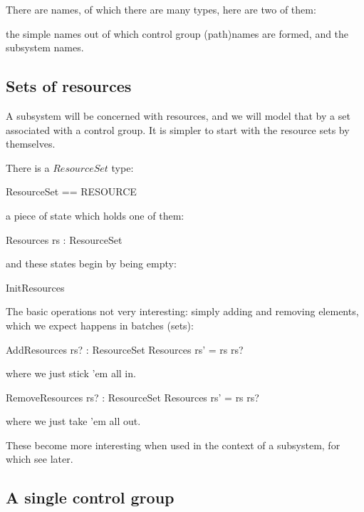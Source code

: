 \documentclass[a4paper,twoside,12pt]{article}
\begin{document}
There are names, of which there are many types, here are two of them:
\begin{zed}
\end{zed}
the simple names out of which control group (path)names are formed, and the subsystem names.

\subsection{Sets of resources}

A subsystem will be concerned with resources, and we will model that by a set associated
with a control group. It is simpler to start with the resource sets by themselves.

There is a $ResourceSet$ type:
\begin{zed}
ResourceSet == \finset RESOURCE
\end{zed}
a piece of state which holds one of them:
\begin{schema}{Resources}
rs : ResourceSet
\end{schema}
and these states begin by being empty:
\begin{zed}
InitResources 
\end{zed}

The basic operations not very interesting: simply adding and removing elements, which we expect happens
in batches (sets):

\begin{schema}{AddResources}
rs? : ResourceSet
\also
\Delta Resources
\where
rs' = rs \cup rs?
\end{schema}
where we just stick 'em all in.

\begin{schema}{RemoveResources}
rs? : ResourceSet
\also
\Delta Resources
\where
rs' = rs \setminus rs?
\end{schema}
where we just take 'em all out.

These become more interesting when used in the context of a subsystem, for which see later.

\subsection{A single control group}
\end{document}
